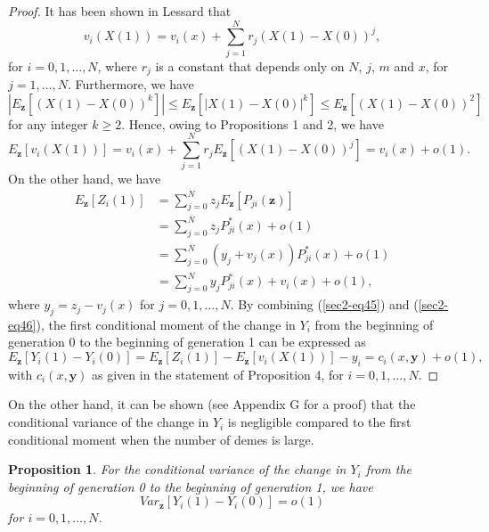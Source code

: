 \documentclass[11pt]{article}
\newtheorem{Proposition}{Proposition}
\begin{document}
\begin{proof}
It has been shown in Lessard \cite{L2009} that
\begin{equation}\label{sec2-eq42}
v_i(X(1))=v_i(x)+\sum_{j=1}^{N}r_j\left(X(1)-X(0)\right)^j,
\end{equation} 
for $i=0, 1, \ldots, N$, where $r_j$ is a constant that depends only on $N$, $j$, $m$ and $x$, for $j=1, \ldots, N$.
Furthermore, we have
\begin{equation}\label{sec2-eq43}
\left|E_{\mathbf{z}}\left[\left(X(1)-X(0)\right)^k\right]\right|\leq E_{\mathbf{z}}\left[\left|X(1)-X(0)\right|^k\right]\leq E_{\mathbf{z}}\left[\left(X(1)-X(0)\right)^2\right]
\end{equation}
for any integer $k\geq 2$. Hence, owing to Propositions 1 and 2, we have
\begin{equation}\label{sec2-eq45}
E_{\mathbf{z}}\left[v_i(X(1))\right]=v_i(x)+\sum_{j=1}^{N}r_j E_{\mathbf{z}}\left[\left(X(1)-X(0)\right)^j\right]=v_i(x)+o(1).
\end{equation} 
 On the other hand, we have
\begin{align}\label{sec2-eq46}
E_{\mathbf{z}}\left[Z_i(1)\right]&=\sum_{j=0}^{N}z_jE_{\mathbf{z}}\left[P_{ji}(\mathbf{z})\right]\nonumber\\
&=\sum_{j=0}^{N}z_jP_{ji}^*(x)+o(1)\nonumber\\
&=\sum_{j=0}^{N}(y_j+v_j(x))P_{ji}^*(x)+o(1)\nonumber\\
&=\sum_{j=0}^{N}y_jP_{ji}^*(x)+v_i(x)+o(1),
\end{align}
where $y_j= z_j - v_j(x)$ for $j=0,1,\ldots,N$.
By combining (\ref{sec2-eq45}) and (\ref{sec2-eq46}), the first conditional moment of the change in $Y_i$ from the beginning of generation 0 to the beginning of generation 1 can be expressed as
\begin{equation}\label{sec2-eq47}
E_{\mathbf{z}}\left[Y_i(1)-Y_i(0)\right]=E_{\mathbf{z}}\left[Z_i(1)\right]-E_{\mathbf{z}}\left[v_i(X(1))\right]-y_i
=c_i(x,\mathbf{y})+o\left(1\right),
\end{equation}
with $c_i(x,\mathbf{y})$ as given in the statement of Proposition 4, for $i=0, 1, \ldots, N$.
\end{proof}

On the other hand, it can be shown (see Appendix G for a proof) that the conditional variance of the change in $Y_i$ is negligible compared to the first conditional moment when the number of demes is large.
\begin{Proposition}\label{Proposition5}
For  the conditional variance of the change in $Y_i$ from the beginning of generation 0 to the beginning of generation 1, we have
\begin{equation}\label{sec2-eq48}
Var_{\mathbf{z}}\left[Y_i(1)-Y_i(0)\right]=o\left(1\right)
\end{equation}
for $i=0, 1, \ldots, N$.
\end{Proposition}
\end{document}
